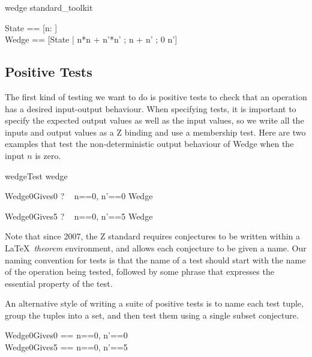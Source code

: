 \documentclass{llncs}
\begin{document}
\begin{zsection}
  \SECTION wedge \parents standard\_toolkit
\end{zsection}
\begin{zed}
  State == [n:  ] \\
  Wedge == [\Delta State | n*n + n'*n' ; n + n' ; 0 \leq n']
\end{zed}

\subsection{Positive Tests}

The first kind of testing we want to do is positive tests to check
that an operation has a desired input-output behaviour.  When
specifying tests, it is important to specify the expected output
values as well as the input values, so we write all the inputs and
output values as a Z binding and use a membership test.  Here are two
examples that test the non-deterministic output behaviour of Wedge
when the input $n$ is zero.  

\begin{zsection}
  \SECTION wedgeTest \parents wedge
\end{zsection}

\begin{theorem}{Wedge0Gives0}
  \vdash? ~ \lblot n==0, n'==0 \rblot \in Wedge
\end{theorem}
\vspace{-5ex}
\begin{theorem}{Wedge0Gives5}
  \vdash? ~ \lblot n==0, n'==5 \rblot \in Wedge
\end{theorem}

Note that since 2007, the Z standard requires conjectures
to be written within a \LaTeX\ \emph{theorem} environment, and allows
each conjecture to be given a name.  Our naming convention for tests
is that the name of a test should start with the name of the operation
being tested, followed by some phrase that expresses the essential
property of the test.

An alternative style of writing a suite of positive tests is to 
name each test tuple, group the tuples into a set, and then test
them using a single subset conjecture.

\begin{zed}
  Wedge0Gives0 == \lblot n==0, n'==0 \rblot \\
  Wedge0Gives5 == \lblot n==0, n'==5 \rblot
\end{zed}
\end{document}
